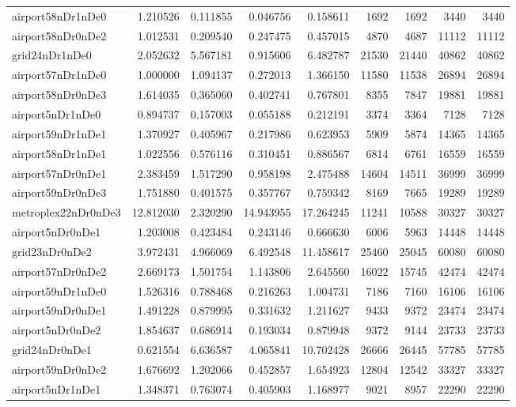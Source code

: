 \begin{longtable}{|l|r|r|r|r|r|r|r|r|}
airport58nDr1nDe0 & 1.210526 & 0.111855 & 0.046756 & 0.158611 & 1692 & 1692 & 3440 & 3440 \\
airport58nDr0nDe2 & 1.012531 & 0.209540 & 0.247475 & 0.457015 & 4870 & 4687 & 11112 & 11112 \\
grid24nDr1nDe0 & 2.052632 & 5.567181 & 0.915606 & 6.482787 & 21530 & 21440 & 40862 & 40862 \\
airport57nDr1nDe0 & 1.000000 & 1.094137 & 0.272013 & 1.366150 & 11580 & 11538 & 26894 & 26894 \\
airport58nDr0nDe3 & 1.614035 & 0.365060 & 0.402741 & 0.767801 & 8355 & 7847 & 19881 & 19881 \\
airport5nDr1nDe0 & 0.894737 & 0.157003 & 0.055188 & 0.212191 & 3374 & 3364 & 7128 & 7128 \\
airport59nDr1nDe1 & 1.370927 & 0.405967 & 0.217986 & 0.623953 & 5909 & 5874 & 14365 & 14365 \\
airport58nDr1nDe1 & 1.022556 & 0.576116 & 0.310451 & 0.886567 & 6814 & 6761 & 16559 & 16559 \\
airport57nDr0nDe1 & 2.383459 & 1.517290 & 0.958198 & 2.475488 & 14604 & 14511 & 36999 & 36999 \\
airport59nDr0nDe3 & 1.751880 & 0.401575 & 0.357767 & 0.759342 & 8169 & 7665 & 19289 & 19289 \\
metroplex22nDr0nDe3 & 12.812030 & 2.320290 & 14.943955 & 17.264245 & 11241 & 10588 & 30327 & 30327 \\
airport5nDr0nDe1 & 1.203008 & 0.423484 & 0.243146 & 0.666630 & 6006 & 5963 & 14448 & 14448 \\
grid23nDr0nDe2 & 3.972431 & 4.966069 & 6.492548 & 11.458617 & 25460 & 25045 & 60080 & 60080 \\
airport57nDr0nDe2 & 2.669173 & 1.501754 & 1.143806 & 2.645560 & 16022 & 15745 & 42474 & 42474 \\
airport59nDr1nDe0 & 1.526316 & 0.788468 & 0.216263 & 1.004731 & 7186 & 7160 & 16106 & 16106 \\
airport59nDr0nDe1 & 1.491228 & 0.879995 & 0.331632 & 1.211627 & 9433 & 9372 & 23474 & 23474 \\
airport5nDr0nDe2 & 1.854637 & 0.686914 & 0.193034 & 0.879948 & 9372 & 9144 & 23733 & 23733 \\
grid24nDr0nDe1 & 0.621554 & 6.636587 & 4.065841 & 10.702428 & 26666 & 26445 & 57785 & 57785 \\
airport59nDr0nDe2 & 1.676692 & 1.202066 & 0.452857 & 1.654923 & 12804 & 12542 & 33327 & 33327 \\
airport5nDr1nDe1 & 1.348371 & 0.763074 & 0.405903 & 1.168977 & 9021 & 8957 & 22290 & 22290 \\

\end{longtable}
